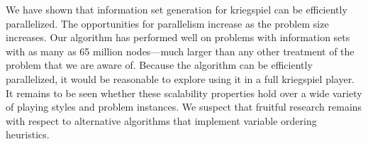 \documentclass[times, 10pt,twocolumn]{article}
\begin{document}
%

We have shown that information set generation for kriegspiel can be efficiently parallelized.  The opportunities for
parallelism increase as the problem size increases.  Our algorithm has performed well on problems with information sets
with as many as 65 million nodes---much larger than any other treatment of the problem that we are aware of.  Because
the algorithm can be efficiently parallelized, it would be reasonable to explore using it in a full kriegspiel player.
It remains to be seen whether these scalability properties hold over a wide variety of playing styles and problem
instances.  We suspect that fruitful research remains with respect to alternative algorithms that implement variable
ordering heuristics.
\end{document}
